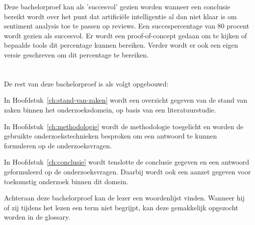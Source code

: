 Deze bachelorproef kan als 'succesvol' gezien worden wanneer een conclusie bereikt wordt over het punt dat artificiële intelligentie al dan niet klaar is om sentiment analysis toe te passen op reviews. Een succespercentage van 80 procent wordt gezien als succesvol. Er wordt een proof-of-concept gedaan om te kijken of bepaalde tools dit percentage kunnen bereiken. Verder wordt er ook een eigen versie geschreven om dit percentage te bereiken.

\section{}
\label{sec:opzet-bachelorproef}


De rest van deze bachelorproef is als volgt opgebouwd:

In Hoofdstuk~\ref{ch:stand-van-zaken} wordt een overzicht gegeven van de stand van zaken binnen het onderzoeksdomein, op basis van een literatuurstudie.

In Hoofdstuk~\ref{ch:methodologie} wordt de methodologie toegelicht en worden de gebruikte onderzoekstechnieken besproken om een antwoord te kunnen formuleren op de onderzoeksvragen.


In Hoofdstuk~\ref{ch:conclusie} wordt tenslotte de conclusie gegeven en een antwoord geformuleerd op de onderzoeksvragen. Daarbij wordt ook een aanzet gegeven voor toekomstig onderzoek binnen dit domein.

Achteraan deze bachelorproef kan de lezer een woordenlijst vinden. Wanneer hij of zij tijdens het lezen een term niet begrijpt, kan deze gemakkelijk opgezocht worden in de glossary.